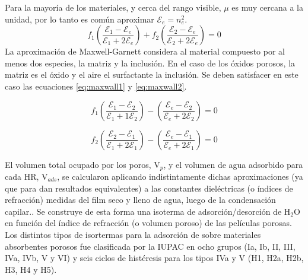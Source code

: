 		Para la mayoría de los materiales, y cerca del rango visible, $\mu$ es muy cercana a la unidad, por lo tanto es común aproximar $\mathcal{E}_e=n_e^2$.
							\begin{equation}
					 		   	 f_1\left(\frac{\mathcal{E}_1-\mathcal{E}_e}{\mathcal{E}_1+2\mathcal{E}_e}\right)+
					 		   	 f_2\left(\frac{\mathcal{E}_2-\mathcal{E}_e}{\mathcal{E}_2+2\mathcal{E}_e}\right)=0
					 		     \label{eq:bruggeman}
								\end{equation}
		La aproximación de Maxwell-Garnett considera al material compuesto por al menos dos especies, la matriz y la inclusión. En el caso de los óxidos porosos, la matriz es el óxido y el aire el surfactante la inclusión. Se deben satisfacer en este caso las ecuaciones \ref{eq:maxwall1} y \ref{eq:maxwall2}.
				
							\begin{equation}
					 		   	 f_1\left(\frac{\mathcal{E}_1-\mathcal{E}_2}{\mathcal{E}_1+1\mathcal{E}_2}\right)-
					 		   	 \left(\frac{\mathcal{E}_e-\mathcal{E}_2}{\mathcal{E}_e+2\mathcal{E}_2}\right)=0
					 		     \label{eq:maxwall1}
								\end{equation}
						
								\begin{equation}
					 		   	 f_2\left(\frac{\mathcal{E}_2-\mathcal{E}_1}{\mathcal{E}_1+2\mathcal{E}_1}\right)-
					 		   	 \left(\frac{\mathcal{E}_e-\mathcal{E}_1}{\mathcal{E}_e+2\mathcal{E}_1}\right)=0
					 		     \label{eq:maxwall2}
								\end{equation}
		
		El volumen total ocupado por los poros, V$_p$, y el volumen de agua adsorbido para cada HR, V$_{ads}$, se calcularon aplicando indistintamente dichas aproximaciones (ya que para \pdm\space dan resultados equivalentes) a las constantes dieléctricas (o índices de refracción) medidas del film seco y lleno de agua, luego de la condensación capilar.\cite{Angelome2008,Fuertes2009,Nano-compuestas2013}. Se construye de esta forma una isoterma de adsorción/desorción de H$_2$O en función del índice de refracción (o volumen poroso) de las películas porosas. Los distintos tipos de isortermas para la adsorción de sobre materiales absorbentes porosos fue clasificada por la IUPAC en ocho grupos (Ia, Ib, II, III, IVa, IVb, V y VI) y seis ciclos de histéresis para los tipos IVa y V (H1, H2a, H2b, H3, H4 y H5). \cite{Thommes2015}

